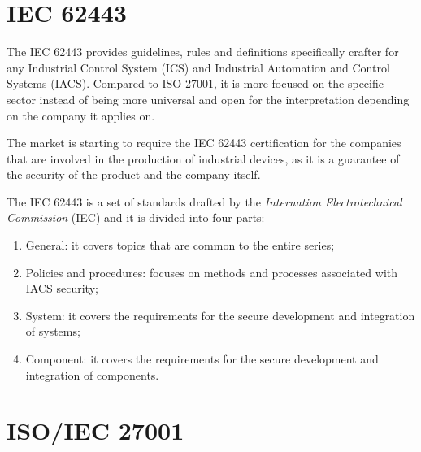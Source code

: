 \section{IEC 62443}

The IEC 62443 provides guidelines, rules and definitions specifically crafter for any Industrial Control System (ICS) and Industrial Automation and Control Systems (IACS). Compared to ISO 27001, it is more focused on the specific sector instead of being more universal and open for the interpretation depending on the company it applies on.

The market is starting to require the IEC 62443 certification for the companies that are involved in the production of industrial devices, as it is a guarantee of the security of the product and the company itself. 

The IEC 62443 is a set of standards drafted by the \textit{Internation Electrotechnical Commission} (IEC) and it is divided into four parts:~\cite{understanding-iec-62443-parts}
\begin{enumerate}
  \item General: it covers topics that are common to the entire series;
  \item Policies and procedures: focuses on methods and processes associated with IACS security;
  \item System: it covers the requirements for the secure development and integration of systems;
  \item Component: it covers the requirements for the secure development and integration of components.
\end{enumerate}






\section{ISO/IEC 27001}






